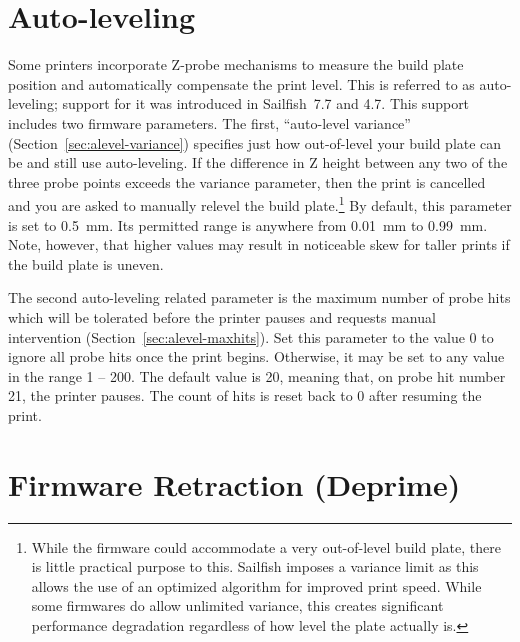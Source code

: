 
\section{Auto-leveling} \label{sec:alevel-params}

Some printers incorporate Z-probe mechanisms to measure the build plate position and automatically compensate the print level.  This is referred to as auto-leveling; support for it was introduced in Sailfish~7.7 and 4.7.  This support includes two firmware parameters.  The first, ``auto-level variance'' (Section~\ref{sec:alevel-variance}) specifies just how out-of-level your build plate can be and still use auto-leveling.  If the difference in Z height between any two of the three probe points exceeds the variance parameter, then the print is cancelled and you are asked to manually relevel the build plate.\footnote{While the firmware could accommodate a very out-of-level build plate, there is little practical purpose to this.  Sailfish imposes a variance limit as this allows the use of an optimized algorithm for improved print speed.  While some firmwares do allow unlimited variance, this creates significant performance degradation regardless of how level the plate actually is.}  By default, this parameter is set to 0.5~mm.  Its permitted range is anywhere from 0.01~mm to 0.99~mm.  Note, however, that higher values may result in noticeable skew for taller prints if the build plate is uneven.

The second auto-leveling related parameter is the maximum number of probe hits which will be tolerated before the printer pauses and requests manual intervention (Section~\ref{sec:alevel-maxhits}). Set this parameter to the value 0 to ignore all probe hits once the print begins.  Otherwise, it may be set to any value in the range 1 -- 200.  The default value is 20, meaning that, on probe hit number 21, the printer pauses.  The count of hits is reset back to 0 after resuming the print.


\section{Firmware Retraction (Deprime)} \label{sec:deprime}

